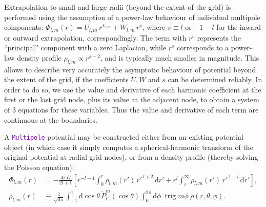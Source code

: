 \documentclass[12pt]{article}
\newcommand{\ttt}[1]{\textcolor{darkviolet}{\texttt{#1}}}
\renewcommand{\d}{\mathrm{d}}
\DeclareMathOperator{\trig}{trig}
\begin{document}
Extrapolation to small and large radii (beyond the extent of the grid) is performed using the assumption of a power-law behaviour of individual multipole components: $\Phi_{l,m}(r) = U_{l,m}\, r^{s_{l,m}} + W_{l,m}\, r^{v}$, where $v\equiv l$ or $-1-l$ for the inward or outward extrapolation, correspondingly. The term with $r^v$ represents the ``principal'' component with a zero Laplacian, while $r^s$ corresponds to a power-law density profile $\rho_{l,m}\propto r^{s-2}$, and is typically much smaller in magnitude. This allows to describe very accurately the asymptotic behaviour of potential beyond the extent of the grid, if the coefficients $U,W$ and $s$ can be determined reliably. In order to do so, we use the value and derivative of each harmonic coefficient at the first or the last grid node, plus its value at the adjacent node, to obtain a system of 3 equations for these variables. Thus the value and derivative of each term are continuous at the boundaries. 

A \ttt{Multipole} potential may be constructed either from an existing potential object (in which case it simply computes a spherical-harmonic transform of the original potential at radial grid nodes), or from a density profile (thereby solving the Poisson equation):
\begin{align}
\Phi_{l,m}(r) &= -\frac{4\pi\,G}{2l+1} \left[ r^{-l-1} \int_0^r \rho_{l,m}(r')\,{r'}^{\,l+2}\,\d r' + r^l\int_r^\infty \rho_{l,m}(r')\,{r'}^{\,1-l}\,\d r' \right],  \label{eq:SphHarmPoisson} \\
\rho_{l,m}(r) &\equiv \frac{1}{\sqrt{4\pi}} \int_{-1}^1 \d \cos\theta\, \tilde P_l^m(\cos\theta) \int_0^{2\pi}\d \phi\:\trig m\phi\:\rho(r,\theta,\phi) .  \label{eq:SphHarmDensity}
\end{align}
\end{document}
